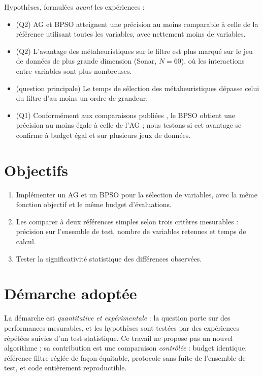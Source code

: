 \documentclass[11pt,a4paper]{report}
\begin{document}
\medskip
\noindent Hypothèses, formulées \emph{avant} les expériences :
\begin{itemize}
  \item[\textbf{H1}] (Q2) AG et BPSO atteignent une précision au moins comparable à celle de la
        référence utilisant toutes les variables, avec nettement moins de variables.
  \item[\textbf{H2}] (Q2) L'avantage des métaheuristiques sur le filtre est plus marqué sur le jeu
        de données de plus grande dimension (Sonar, $N = 60$), où les interactions entre variables
        sont plus nombreuses.
  \item[\textbf{H3}] (question principale) Le temps de sélection des métaheuristiques dépasse celui
        du filtre d'au moins un ordre de grandeur.
  \item[\textbf{H4}] (Q1) Conformément aux comparaisons publiées \cite{babaoglu2010,rafdi2021},
        le BPSO obtient une précision au moins égale à celle de l'AG ; nous testons si cet avantage
        se confirme à budget égal et sur plusieurs jeux de données.
\end{itemize}

\section*{Objectifs}
\begin{enumerate}
  \item Implémenter un AG et un BPSO pour la sélection de variables, avec la même fonction
        objectif et le même budget d'évaluations.
  \item Les comparer à deux références simples selon trois critères mesurables : précision sur
        l'ensemble de test, nombre de variables retenues et temps de calcul.
  \item Tester la significativité statistique des différences observées.
\end{enumerate}

\section*{Démarche adoptée}
La démarche est \emph{quantitative et expérimentale} : la question porte sur des performances
mesurables, et les hypothèses sont testées par des expériences répétées suivies d'un test
statistique. Ce travail ne propose pas un nouvel algorithme ; sa contribution est une comparaison
\emph{contrôlée} : budget identique, référence filtre réglée de façon équitable, protocole sans
fuite de l'ensemble de test, et code entièrement reproductible.
\end{document}
